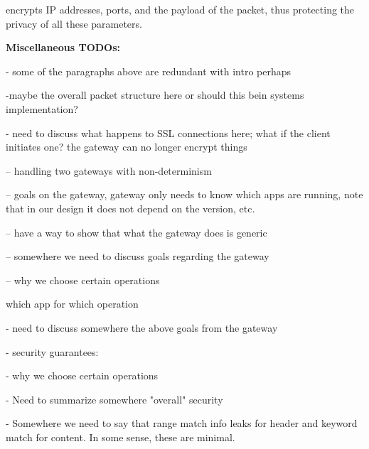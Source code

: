 \sys encrypts IP addresses, ports, and the payload of the packet, thus protecting the privacy of all these parameters. 


{\bf Miscellaneous TODOs:}

- some of the paragraphs above are redundant with intro perhaps

-maybe the overall packet structure here or should this bein systems implementation? 

- need to discuss what happens to SSL connections here; what if the client initiates one? the gateway can no longer
encrypt things

-- handling two gateways with non-determinism

-- goals on the gateway, gateway only needs to know which apps are running, note that in our design
it does not depend on the version, etc. 

-- have a way to show that what the gateway does is generic 
   
-- somewhere we need to discuss goals regarding the gateway

-- why we choose certain operations

which app for which operation


- need to discuss somewhere the above goals from the gateway

- security guarantees:

- why we choose certain operations

- Need to summarize somewhere "overall" security

- Somewhere we need to say that range match info leaks for header and keyword match for content. In some sense, these are minimal. 

